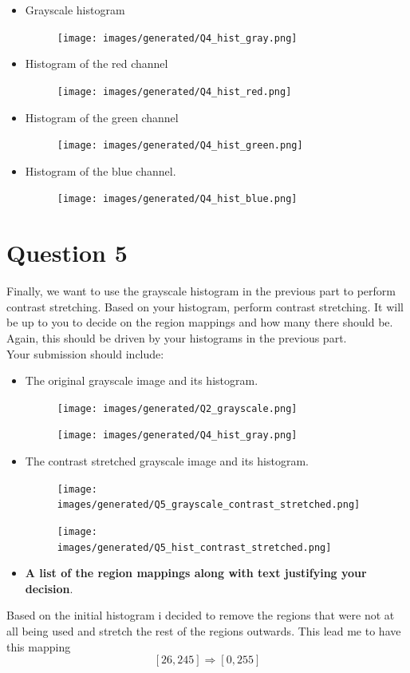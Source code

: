 \documentclass{article}
\begin{document}
\begin{itemize}
\item Grayscale histogram
\begin{figure}
    \texttt{[image: images/generated/Q4\_hist\_gray.png]}
\end{figure}
\item Histogram of the red channel
\begin{figure}
    \texttt{[image: images/generated/Q4\_hist\_red.png]}
\end{figure}
\item Histogram of the green channel
\begin{figure}
    \texttt{[image: images/generated/Q4\_hist\_green.png]}
\end{figure}
\item Histogram of the blue channel.
\begin{figure}
    \texttt{[image: images/generated/Q4\_hist\_blue.png]}
\end{figure}
\end{itemize}


\section*{Question 5}
Finally, we want to use the grayscale histogram in the previous part to perform contrast stretching.   Based on your histogram, perform contrast stretching.  It will be up to you to decide on the region mappings and how many there should be.  Again, this should be driven by your histograms in the previous part.\\

\noindent
Your submission should include:
\begin{itemize}
\item The original grayscale image and its histogram.
\begin{figure}
    \texttt{[image: images/generated/Q2\_grayscale.png]}
\end{figure}
\begin{figure}
    \texttt{[image: images/generated/Q4\_hist\_gray.png]}
\end{figure}
\item The contrast stretched grayscale image and its histogram.
\begin{figure}
    \texttt{[image: images/generated/Q5\_grayscale\_contrast\_stretched.png]}
\end{figure}
\begin{figure}
    \texttt{[image: images/generated/Q5\_hist\_contrast\_stretched.png]}
\end{figure}
\item \textbf{A list of the region mappings along with text justifying your decision}.
\end{itemize}
Based on the initial histogram i decided to remove the regions that were not at all being used and stretch the rest of the regions outwards.
This lead me to have this mapping
$$ [26, 245] \Rightarrow [0,255] $$
\end{document}
